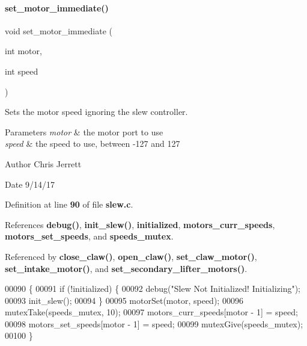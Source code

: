 \paragraph{set\+\_\+motor\+\_\+immediate()}
{\footnotesize\ttfamily void set\+\_\+motor\+\_\+immediate (\begin{DoxyParamCaption}\item[{int}]{motor,  }\item[{int}]{speed }\end{DoxyParamCaption})}



Sets the motor speed ignoring the slew controller. 


\begin{DoxyParams}{Parameters}
{\em motor} & the motor port to use \\
\hline
{\em speed} & the speed to use, between -\/127 and 127 \\
\hline
\end{DoxyParams}
\begin{DoxyAuthor}{Author}
Chris Jerrett 
\end{DoxyAuthor}
\begin{DoxyDate}{Date}
9/14/17 
\end{DoxyDate}


Definition at line \textbf{ 90} of file \textbf{ slew.\+c}.



References \textbf{ debug()}, \textbf{ init\+\_\+slew()}, \textbf{ initialized}, \textbf{ motors\+\_\+curr\+\_\+speeds}, \textbf{ motors\+\_\+set\+\_\+speeds}, and \textbf{ speeds\+\_\+mutex}.



Referenced by \textbf{ close\+\_\+claw()}, \textbf{ open\+\_\+claw()}, \textbf{ set\+\_\+claw\+\_\+motor()}, \textbf{ set\+\_\+intake\+\_\+motor()}, and \textbf{ set\+\_\+secondary\+\_\+lifter\+\_\+motors()}.


\begin{DoxyCode}
00090                                                \{
00091   \textcolor{keywordflow}{if} (!initialized) \{
00092     debug(\textcolor{stringliteral}{"Slew Not Initialized! Initializing"});
00093     init_slew();
00094   \}
00095   motorSet(motor, speed);
00096   mutexTake(speeds_mutex, 10);
00097   motors_curr_speeds[motor - 1] = speed;
00098   motors_set_speeds[motor - 1] = speed;
00099   mutexGive(speeds_mutex);
00100 \}
\end{DoxyCode}
\mbox{\label{a00065_a7dff2b79dffe55fb936d977594d7c01d}} 
